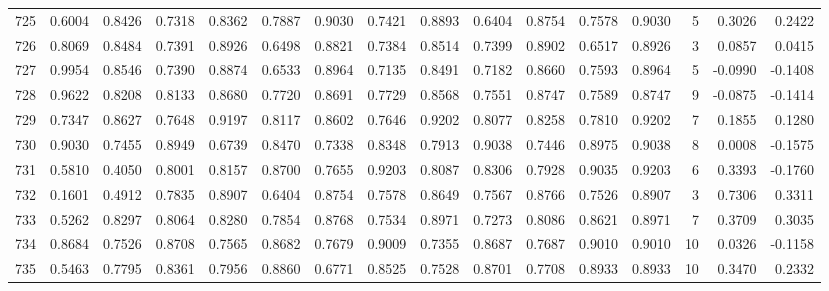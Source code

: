 \begin{tabular}{lrrrrrrrrrrrrrrr}
725 &      0.6004 &  0.8426 &  0.7318 &  0.8362 &  0.7887 &  0.9030 &  0.7421 &  0.8893 &  0.6404 &  0.8754 &   0.7578 &     0.9030 &      5 &                    0.3026 &                     0.2422 \\
726 &      0.8069 &  0.8484 &  0.7391 &  0.8926 &  0.6498 &  0.8821 &  0.7384 &  0.8514 &  0.7399 &  0.8902 &   0.6517 &     0.8926 &      3 &                    0.0857 &                     0.0415 \\
727 &      0.9954 &  0.8546 &  0.7390 &  0.8874 &  0.6533 &  0.8964 &  0.7135 &  0.8491 &  0.7182 &  0.8660 &   0.7593 &     0.8964 &      5 &                   -0.0990 &                    -0.1408 \\
728 &      0.9622 &  0.8208 &  0.8133 &  0.8680 &  0.7720 &  0.8691 &  0.7729 &  0.8568 &  0.7551 &  0.8747 &   0.7589 &     0.8747 &      9 &                   -0.0875 &                    -0.1414 \\
729 &      0.7347 &  0.8627 &  0.7648 &  0.9197 &  0.8117 &  0.8602 &  0.7646 &  0.9202 &  0.8077 &  0.8258 &   0.7810 &     0.9202 &      7 &                    0.1855 &                     0.1280 \\
730 &      0.9030 &  0.7455 &  0.8949 &  0.6739 &  0.8470 &  0.7338 &  0.8348 &  0.7913 &  0.9038 &  0.7446 &   0.8975 &     0.9038 &      8 &                    0.0008 &                    -0.1575 \\
731 &      0.5810 &  0.4050 &  0.8001 &  0.8157 &  0.8700 &  0.7655 &  0.9203 &  0.8087 &  0.8306 &  0.7928 &   0.9035 &     0.9203 &      6 &                    0.3393 &                    -0.1760 \\
732 &      0.1601 &  0.4912 &  0.7835 &  0.8907 &  0.6404 &  0.8754 &  0.7578 &  0.8649 &  0.7567 &  0.8766 &   0.7526 &     0.8907 &      3 &                    0.7306 &                     0.3311 \\
733 &      0.5262 &  0.8297 &  0.8064 &  0.8280 &  0.7854 &  0.8768 &  0.7534 &  0.8971 &  0.7273 &  0.8086 &   0.8621 &     0.8971 &      7 &                    0.3709 &                     0.3035 \\
734 &      0.8684 &  0.7526 &  0.8708 &  0.7565 &  0.8682 &  0.7679 &  0.9009 &  0.7355 &  0.8687 &  0.7687 &   0.9010 &     0.9010 &     10 &                    0.0326 &                    -0.1158 \\
735 &      0.5463 &  0.7795 &  0.8361 &  0.7956 &  0.8860 &  0.6771 &  0.8525 &  0.7528 &  0.8701 &  0.7708 &   0.8933 &     0.8933 &     10 &                    0.3470 &                     0.2332 \\

\end{tabular}
